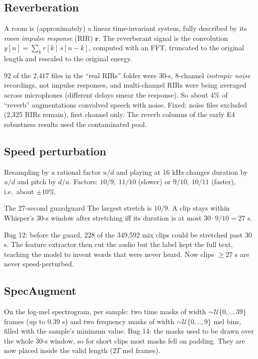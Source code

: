 \subsection{Reverberation}

A room is (approximately) a linear time-invariant system, fully described by its \emph{room impulse response} (RIR) $\bm r$. The
reverberant signal is the convolution $y[n]=\sum_k r[k]\,s[n-k]$, computed with an FFT, truncated to the original length and
rescaled to the original energy.

\begin{vivatip}
92 of the 2{,}417 files in the ``real RIRs'' folder were 30-s, 8-channel \emph{isotropic noise} recordings, not impulse responses, and
multi-channel RIRs were being averaged across microphones (different delays smear the response). So about 4\% of ``reverb''
augmentations convolved speech with noise. Fixed: noise files excluded (2{,}325 RIRs remain), first channel only. The reverb columns
of the early E4 robustness results used the contaminated pool.
\end{vivatip}

\subsection{Speed perturbation}

Resampling by a rational factor $u/d$ and playing at 16 kHz changes duration by $u/d$ and pitch by $d/u$. Factors:
$10/9,\ 11/10$ (slower) or $9/10,\ 10/11$ (faster), i.e.\ about $\pm10\%$.

\begin{proposition}{The 27-second guard}{guard}
The largest stretch is $10/9$. A clip stays within Whisper's 30-s window after stretching iff its duration is at most $30\cdot9/10=27$ s.
\end{proposition}
Bug 12: before the guard, 228 of the 349{,}592 mix clips could be stretched past 30 s. The feature extractor then cut the audio but the
label kept the full text, teaching the model to invent words that were never heard. Now clips $\ge27$ s are never speed-perturbed.

\subsection{SpecAugment}

On the log-mel spectrogram, per sample: two time masks of width $\sim\mathcal U\{0,..,39\}$ frames (up to 0.39 s) and two frequency
masks of width $\sim\mathcal U\{0,..,9\}$ mel bins, filled with the sample's minimum value. Bug 14: the masks used to be drawn over the
whole 30-s window, so for short clips most masks fell on padding. They are now placed inside the valid length ($2T$ mel frames).

